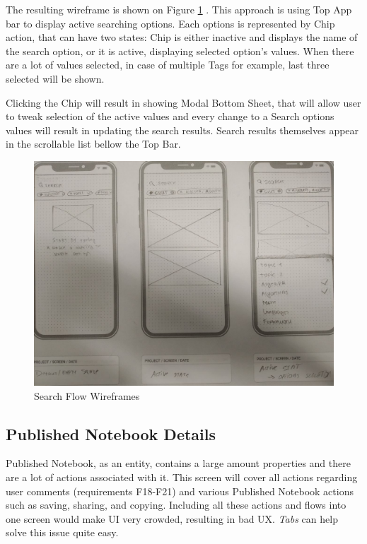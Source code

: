 \documentclass[thesis=B,english]{FITthesis}[2012/10/20]
\begin{document}
The resulting wireframe is shown on Figure \ref{fig:section-search} . This approach is using Top App bar to display active searching options. Each options is represented by Chip action, that can have two states: Chip is either inactive  and displays the name of the search option, or it is active, displaying selected option's values. When there are a lot of values selected, in case of multiple Tags for example, last three selected will be shown. 

Clicking the Chip will result in showing Modal Bottom Sheet, that will allow user to tweak selection of the active values and every change to a Search options values will result in updating the search results. Search results themselves appear in the scrollable list bellow the Top Bar. 
   

\begin{figure}[H]
\centering
  \includegraphics[scale=0.23]{sectionSearch}
  \caption{Search Flow Wireframes}
  \label{fig:section-search}
\end{figure}



 
\subsection{Published Notebook Details}
Published Notebook, as an entity, contains a large amount properties and there are a lot of actions associated with it. This screen will cover all actions regarding user comments (requirements F18-F21) and various Published Notebook actions such as saving, sharing, and copying. Including all these actions and flows into one screen would make UI very crowded, resulting in bad UX. \textit{Tabs} can help solve this issue quite easy.
\end{document}
